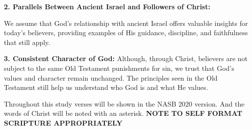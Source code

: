 \textbf{2. Parallels Between Ancient Israel and Followers of Christ:}

We assume that God's relationship with ancient Israel offers valuable insights for today's believers, providing examples of His guidance, discipline, and faithfulness that still apply.\\
\vspace{2\baselineskip}

\textbf{3. Consistent Character of God:} 
Although, through Christ, believers are not subject to the same Old Testament punishments for sin, we trust that God's values and character remain unchanged. The principles seen in the Old Testament still help us understand who God is and what He values.\\

\vspace{2\baselineskip}

Throughout this study verses will be shown in the NASB 2020 version. And the words of Christ will be noted with an asterisk.
\textbf{NOTE TO SELF FORMAT SCRIPTURE APPROPRIATELY}
